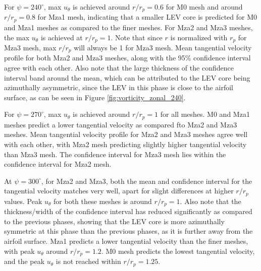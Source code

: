 For $\psi = 240^\circ$, max $u_\theta$ is achieved around $r/r_p= 0.6$ for M0 mesh and around $r/r_p= 0.8$ for Mza1 mesh, indicating that a smaller LEV core is predicted for M0 and Mza1 meshes as compared to the finer meshes. 
For Mza2 and Mza3 meshes, the max $u_\theta$ is achieved at $r/r_p = 1$. Note that since $r$ is normalized with $r_p$ for Mza3 mesh, max $r/r_p$ will always be 1 for Mza3 mesh. 
Mean tangential velocity profile for both Mza2 and Mza3 meshes, along with the 95\% confidence interval agree with each other. 
Also note that the large thickness of the confidence interval band around the mean, which can be attributed to the LEV core being azimuthally asymmetric, since the LEV in this phase is close to the airfoil surface, as can be seen in Figure \ref{fig:vorticity_zonal_240}. 

For $\psi = 270^\circ$, max $u_\theta$ is achieved around $r/r_p= 1$ for all meshes. 
M0 and Mza1 meshes predict a lower tangential velocity as compared fto Mza2 and Mza3 meshes. 
Mean tangential velocity profile for Mza2 and Mza3 meshes agree well with each other, with Mza2 mesh predicting slightly higher tangential velocity than Mza3 mesh. 
The confidence interval for Mza3 mesh lies within the confidence interval for Mza2 mesh.

At $\psi = 300^\circ$, for Mza2 and Mza3, both the mean and confidence interval for the tangential velocity matches very well, apart for slight differences at higher $r/r_p$ values. 
Peak $u_\theta$ for both these meshes is around $r/r_p= 1$.
Also note that the thickness/width of the confidence interval has reduced significantly as compared to the previous phases, showing that the LEV core is more azimuthally symmetric at this phase than the previous phases, as it is further away from the airfoil surface.
Mza1 predicts a lower tangential velocity than the finer meshes, with peak $u_\theta$ around $r/r_p= 1.2$. M0 mesh predicts the lowest tangential velocity, and the peak $u_\theta$ is not reached within $r/r_p= 1.25$.


